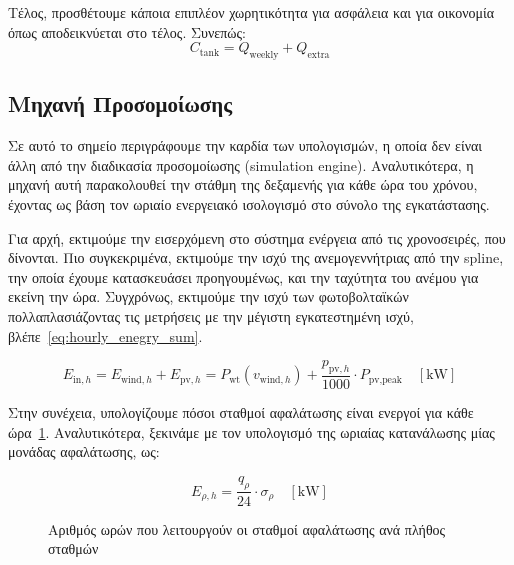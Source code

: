 Τέλος, προσθέτουμε κάποια επιπλέον χωρητικότητα για ασφάλεια και για οικονομία
όπως αποδεικνύεται στο τέλος. Συνεπώς:
\begin{equation}\label{eq:tank_capacity}
	C_{\text{tank}} = Q_{\text{weekly}} + Q_{\text{extra}}
\end{equation}

\subsection{Μηχανή Προσομοίωσης}
Σε αυτό το σημείο περιγράφουμε την καρδία των υπολογισμών, η οποία δεν είναι
άλλη από την διαδικασία προσομοίωσης (simulation engine). Αναλυτικότερα, η
μηχανή αυτή παρακολουθεί την στάθμη της δεξαμενής για κάθε ώρα του χρόνου,
έχοντας ως βάση τον ωριαίο ενεργειακό ισολογισμό στο σύνολο της εγκατάστασης.

Για αρχή, εκτιμούμε την εισερχόμενη στο σύστημα ενέργεια από τις χρονοσειρές,
που δίνονται. Πιο συγκεκριμένα, εκτιμούμε την ισχύ της ανεμογεννήτριας από την
spline, την οποία έχουμε κατασκευάσει προηγουμένως, και την ταχύτητα του ανέμου
για εκείνη την ώρα. Συγχρόνως, εκτιμούμε την ισχύ των φωτοβολταϊκών
πολλαπλασιάζοντας τις μετρήσεις με την μέγιστη εγκατεστημένη ισχύ, βλέπε~\eqref{eq:hourly_enegry_sum}.

\begin{equation}\label{eq:hourly_enegry_sum}
	E_{\text{in},h} = E_{\text{wind},h} + E_{\text{pv},h}= P_{\text{wt}} \left(v_{\text{wind},h}\right) + \frac{p_{\text{pv},h}}{1000}\cdot P_{\text{pv,peak}}\quad \left[\si{\kilo\watt}\right]
\end{equation}

Στην συνέχεια, υπολογίζουμε πόσοι σταθμοί αφαλάτωσης είναι ενεργοί για κάθε
ώρα~\ref{fig:working_hours_per_des}. Αναλυτικότερα, ξεκινάμε με τον υπολογισμό της ωριαίας κατανάλωσης μίας
μονάδας αφαλάτωσης, ως:

\begin{equation}\label{eq:hourly_desalination_consumption}
	E_{\rho ,h}= \frac{q_{\rho}}{24}\cdot \sigma_{\rho}\quad \left[\si{\kilo\watt}\right]
\end{equation}

\begin{figure}[ht]
	\centering
	\caption{Αριθμός ωρών που λειτουργούν οι σταθμοί αφαλάτωσης ανά πλήθος σταθμών}\label{fig:working_hours_per_des}
\end{figure}

